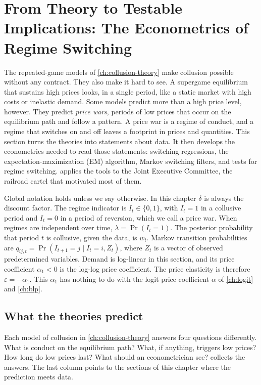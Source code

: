 \section{From Theory to Testable Implications: The Econometrics of Regime Switching}\label{sec:13-implications}

The repeated-game models of \cref{ch:collusion-theory} make collusion possible without any contract. They also make
it hard to see. A supergame equilibrium that sustains high prices looks, in a single period, like a static market
with high costs or inelastic demand. Some models predict more than a high price level, however. They predict
\emph{price wars}, periods of low prices that occur on the equilibrium path and follow a pattern. A price war is a
regime of conduct, and a regime that switches on and off leaves a footprint in prices and quantities. This section
turns the theories into statements about data. It then develops the econometrics needed to read those statements:
switching regressions, the expectation-maximization (EM) algorithm, Markov switching filters, and tests for regime switching.  applies the tools to the Joint Executive Committee, the railroad cartel that motivated
most of them.

Global notation holds unless we say otherwise. In this chapter $\delta$ is always the discount factor. The regime
indicator is $I_t \in \{0,1\}$, with $I_t = 1$ in a collusive period and $I_t = 0$ in a period of reversion, which we
call a price war. When regimes are independent over time, $\lambda = \Pr(I_t = 1)$. The posterior probability that
period $t$ is collusive, given the data, is $w_t$. Markov transition probabilities are
$q_{ij,t} = \Pr(I_{t+1} = j \mid I_t = i, Z_t)$, where $Z_t$ is a vector of observed predetermined variables. Demand is
log-linear in this section, and its price coefficient $\alpha_1 < 0$ is the log-log price coefficient. The price
elasticity is therefore $\varepsilon = -\alpha_1$. This $\alpha_1$ has nothing to do with the logit price coefficient
$\alpha$ of \cref{ch:logit} and \cref{ch:blp}.

\subsection{What the theories predict}\label{sec:13-predictions}

Each model of collusion in \cref{ch:collusion-theory} answers four questions differently. What is conduct on the
equilibrium path? What, if anything, triggers low prices? How long do low prices last? What should an
econometrician see?  collects the answers. The last column points to the sections of this
chapter where the prediction meets data.

